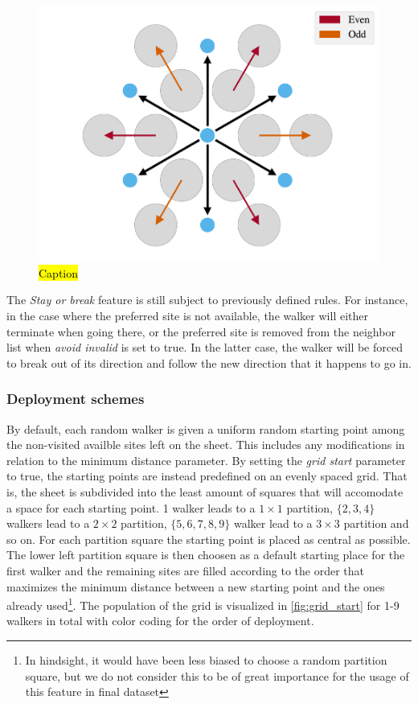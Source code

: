 \begin{figure}[H]
  \centering
  \includegraphics[width=0.5\linewidth]{figures/system/stay_or_break.pdf}
  \caption{\hl{Caption}}
  \label{fig:stay_or_break}
\end{figure}

The \textit{Stay or break} feature is still subject to previously defined rules. For instance, in the case where the preferred site is not available, the walker will either terminate when going there, or the preferred site is removed from the neighbor list when \textit{avoid invalid} is set to true. In the latter case, the walker will be forced to break out of its direction and follow the new direction that it happens to go in.


\subsubsection{Deployment schemes} %
By default, each random walker is given a uniform random starting point among
the non-visited availble sites left on the sheet. This includes any modifications in relation to the minimum distance parameter. By setting the \textit{grid start} parameter to true, the starting points are instead predefined on an evenly
spaced grid. That is, the sheet is subdivided into the least amount of squares
that will accomodate a space for each starting point. 1 walker leads to a
$1\times 1$ partition, $\{2,3,4\}$ walkers lead to a $2\times 2$ partition,
$\{5,6,7,8,9\}$ walker lead to a $3\times 3$ partition and so on. For each partition square the starting point is placed as central as possible. The lower left partition square is then choosen as a default starting place for the first
walker and the remaining sites are filled according to the order that
maximizes the minimum distance between a new starting point and the ones already
used\footnote{In hindsight, it would have been less biased to choose a random partition square, but we do not consider this to be of great
importance for the usage of this feature in final dataset }. The population of the grid is visualized in \cref{fig:grid_start} for 1-9 walkers in total with color coding for the order of deployment. 


